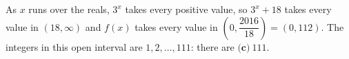 As $x$ runs over the reals, $3^x$ takes every positive value, so $3^x+18$ takes every value in $(18,\infty)$ and $f(x)$ takes every value in $\left(0,\dfrac{2016}{18}\right)=(0,112)$. The integers in this open interval are $1,2,\dots,111$: there are $\boxed{\textbf{(c)}\ 111}$.
